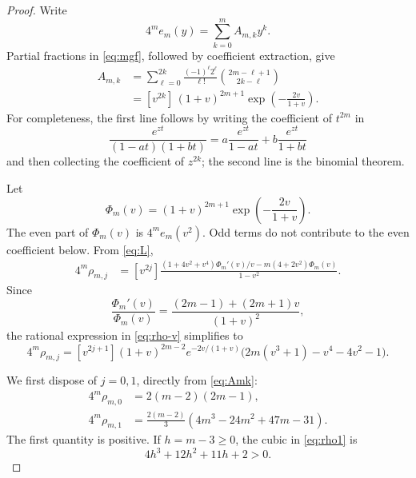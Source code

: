 \documentclass[11pt]{article}
\begin{document}
\begin{proof}
Write
\[
 4^m e_m(y)=\sum_{k=0}^{m}A_{m,k}y^k.
\]
Partial fractions in \eqref{eq:mgf}, followed by coefficient extraction,
give
\begin{align}
 A_{m,k}
 &=\sum_{\ell=0}^{2k}
   \frac{(-1)^\ell2^\ell}{\ell!}
   \binom{2m-\ell+1}{2k-\ell} \label{eq:Amk}\\
 &=[v^{2k}]\,(1+v)^{2m+1}
       \exp\!\left(-\frac{2v}{1+v}\right). \label{eq:Phi}
\end{align}
For completeness, the first line follows by writing the coefficient of
\(t^{2m}\) in
\[
 \frac{e^{zt}}{(1-at)(1+bt)}
 =a\frac{e^{zt}}{1-at}+b\frac{e^{zt}}{1+bt}
\]
and then collecting the coefficient of \(z^{2k}\); the second line is the
binomial theorem.

Let
\[
 \Phi_m(v)=(1+v)^{2m+1}
       \exp\!\left(-\frac{2v}{1+v}\right).
\]
The even part of \(\Phi_m(v)\) is
\(4^m e_m(v^2)\).  Odd terms do not contribute to the even coefficient
below.  From \eqref{eq:L},
\begin{align}
 4^m\rho_{m,j}
  &=[v^{2j}]
  \frac{(1+4v^2+v^4)\Phi_m'(v)/v
       -m(4+2v^2)\Phi_m(v)}{1-v^2}. \label{eq:rho-v}
\end{align}
Since
\[
 \frac{\Phi_m'(v)}{\Phi_m(v)}
 =\frac{(2m-1)+(2m+1)v}{(1+v)^2},
\]
the rational expression in \eqref{eq:rho-v} simplifies to
\begin{equation}\label{eq:rho-simple}
 4^m\rho_{m,j}=[v^{2j+1}]
 (1+v)^{2m-2}e^{-2v/(1+v)}
 \bigl(2m(v^3+1)-v^4-4v^2-1\bigr).
\end{equation}

We first dispose of \(j=0,1\), directly from \eqref{eq:Amk}:
\begin{align}
 4^m\rho_{m,0}&=2(m-2)(2m-1),\label{eq:rho0}\\
 4^m\rho_{m,1}&=\frac{2(m-2)}3
  (4m^3-24m^2+47m-31).\label{eq:rho1}
\end{align}
The first quantity is positive.  If \(h=m-3\geq0\), the cubic in
\eqref{eq:rho1} is
\[
 4h^3+12h^2+11h+2>0.
\]


\end{proof}
\end{document}
